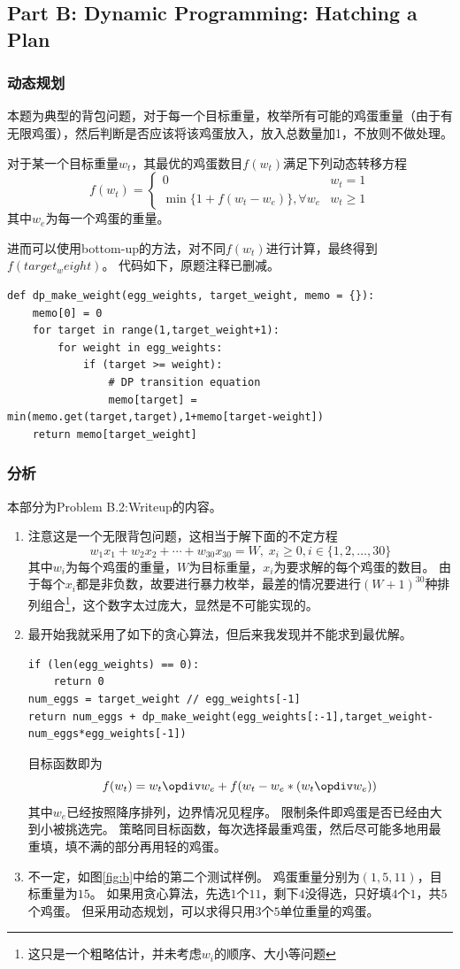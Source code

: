 \documentclass[logo,reportComp]{thesis}
\begin{document}
\subsection{Part B: Dynamic Programming: Hatching a Plan}
\subsubsection{动态规划}
本题为典型的背包问题，对于每一个目标重量，枚举所有可能的鸡蛋重量（由于有无限鸡蛋），然后判断是否应该将该鸡蛋放入，放入总数量加1，不放则不做处理。

对于某一个目标重量$w_t$，其最优的鸡蛋数目$f(w_t)$满足下列动态转移方程
\[f(w_t)=\begin{cases}0 & w_t=1\\\min\{1+f(w_t-w_e)\},\forall w_e & w_t\geq 1\end{cases}\]
其中$w_e$为每一个鸡蛋的重量。

进而可以使用bottom-up的方法，对不同$f(w_t)$进行计算，最终得到$f(target_weight)$。
代码如下，原题注释已删减。
\begin{lstlisting}
def dp_make_weight(egg_weights, target_weight, memo = {}):
    memo[0] = 0
    for target in range(1,target_weight+1):
        for weight in egg_weights:
            if (target >= weight):
                # DP transition equation
                memo[target] = min(memo.get(target,target),1+memo[target-weight])
    return memo[target_weight]
\end{lstlisting}

\subsubsection{分析}
本部分为Problem B.2:Writeup的内容。
\begin{enumerate}
	\item 注意这是一个无限背包问题，这相当于解下面的不定方程
	\[w_1x_1+w_2x_2+\cdots+w_{30}x_{30}=W,\;x_i\geq 0,i\in\{1,2,\ldots,30\}\]
	其中$w_i$为每个鸡蛋的重量，$W$为目标重量，$x_i$为要求解的每个鸡蛋的数目。
	由于每个$x_i$都是非负数，故要进行暴力枚举，最差的情况要进行$(W+1)^{30}$种排列组合\footnote{这只是一个粗略估计，并未考虑$w_i$的顺序、大小等问题}，这个数字太过庞大，显然是不可能实现的。
	\item 最开始我就采用了如下的贪心算法，但后来我发现并不能求到最优解。
\begin{lstlisting}
if (len(egg_weights) == 0):
    return 0
num_eggs = target_weight // egg_weights[-1]
return num_eggs + dp_make_weight(egg_weights[:-1],target_weight-num_eggs*egg_weights[-1])
\end{lstlisting}
	目标函数即为
	\[f(w_t)=w_t\opdiv w_e+f(w_t-w_e*(w_t\opdiv w_e))\]
	其中$w_e$已经按照降序排列，边界情况见程序。
	限制条件即鸡蛋是否已经由大到小被挑选完。
	策略同目标函数，每次选择最重鸡蛋，然后尽可能多地用最重填，填不满的部分再用轻的鸡蛋。
	\item 不一定，如图\ref{fig:b}中给的第二个测试样例。
	鸡蛋重量分别为$(1,5,11)$，目标重量为$15$。
	如果用贪心算法，先选$1$个$11$，剩下$4$没得选，只好填$4$个$1$，共$5$个鸡蛋。
	但采用动态规划，可以求得只用$3$个$5$单位重量的鸡蛋。
\end{enumerate}
\end{document}
